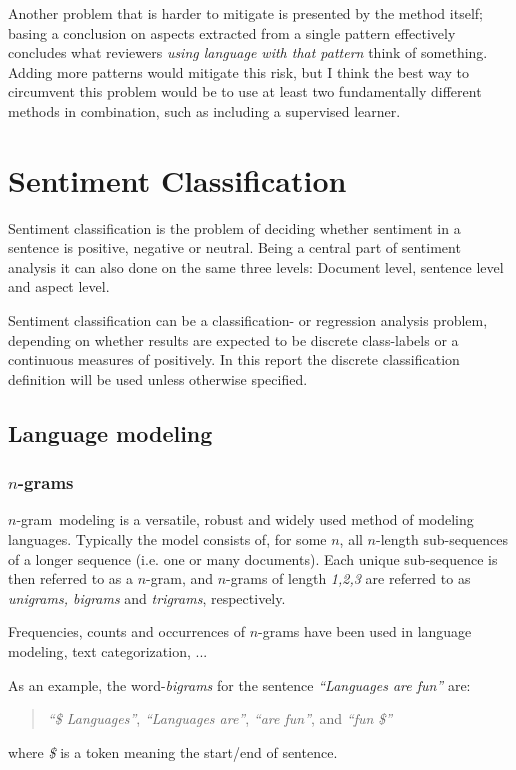 \documentclass[a4paper,11pt]{kth-mag}
\newcommand{\todo}{ ... }
\newcommand{\ngram}{$n$-gram}
\begin{document}
Another problem that is harder to mitigate is presented by the method itself; basing a conclusion on aspects extracted from a single pattern effectively concludes what reviewers \emph{using language with that pattern} think of something. Adding more patterns would mitigate this risk, but I think the best way to circumvent this problem would be to use at least two fundamentally different methods in combination, such as including a supervised learner.


\chapter{Sentiment Classification}
Sentiment classification is the problem of deciding whether sentiment in a sentence is positive, negative or neutral\cite{nlp_book}. Being a central part of sentiment analysis it can also done on the same three levels: Document level, sentence level and aspect level.

Sentiment classification can be a classification- or regression analysis problem\cite{liu2012sentiment}, depending on whether results are expected to be discrete class-labels or a continuous measures of positively. In this report the discrete classification definition will be used unless otherwise specified.

\section{Language modeling}

\subsection{\ngram s}
\ngram~modeling is a versatile, robust and widely used method of modeling languages. Typically the model consists of, for some $n$, all $n$-length sub-sequences of a longer sequence (i.e. one or many documents). Each unique sub-sequence is then referred to as a \ngram, and \ngram s of length \emph{1,2,3} are referred to as \emph{unigrams, bigrams} and \emph{trigrams}, respectively\cite{ngrams}.

Frequencies, counts and occurrences of \ngram s have been used in language modeling\cite{chen_goodman}, text categorization\cite{ngrams}, \todo

As an example, the word-\emph{bigrams} for the sentence \emph{``Languages are fun''} are:
\begin{quote}
  \vspace*{0.1cm}
  \centering
\emph{``\$ Languages''}, \emph{``Languages are''}, \emph{``are fun''}, and \emph{``fun \$''}
\end{quote}
where \emph{\$} is a token meaning the start/end of sentence.
\end{document}

